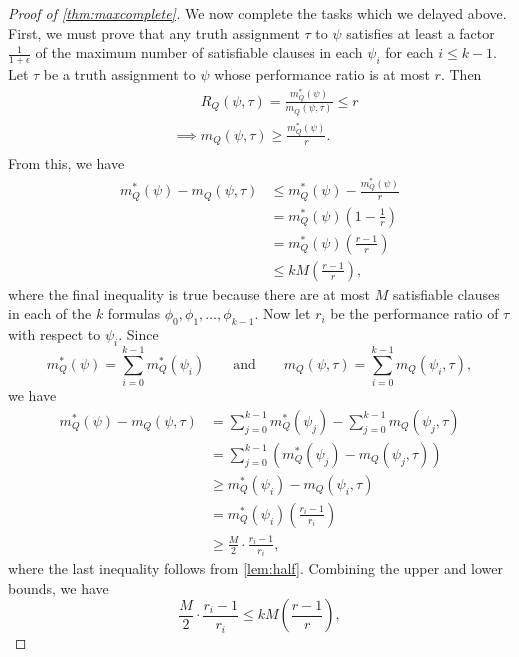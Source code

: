 \documentclass[]{article}
\theoremstyle{plain}
\theoremstyle{definition}
\begin{document}
\begin{proof}[Proof of \autoref{thm:maxcomplete}]
  We now complete the tasks which we delayed above.
  First, we must prove that any truth assignment $\tau$ to $\psi$ satisfies at least a factor $\frac{1}{1 + \epsilon}$ of the maximum number of satisfiable clauses in each $\psi_i$ for each $i \leq k - 1$.
  Let $\tau$ be a truth assignment to $\psi$ whose performance ratio is at most $r$.
  Then
  \begin{align*}
    & \phantom{\implies} R_Q(\psi, \tau) = \frac{m^*_Q(\psi)}{m_Q(\psi, \tau)} \leq r \\
    & \implies m_Q(\psi, \tau) \geq \frac{m^*_Q(\psi)}{r}. \\
  \end{align*}
  From this, we have
  \begin{align*}
    m^*_Q(\psi) - m_Q(\psi, \tau) & \leq m^*_Q(\psi) - \frac{m^*_Q(\psi)}{r} \\
    & = m^*_Q(\psi) \left(1 - \frac{1}{r}\right) \\
    & = m^*_Q(\psi) \left(\frac{r - 1}{r}\right)\\
    & \leq kM \left(\frac{r - 1}{r}\right),
  \end{align*}
  where the final inequality is true because there are at most $M$ satisfiable clauses in each of the $k$ formulas $\phi_0, \phi_1, \dotsc, \phi_{k - 1}$.
  Now let $r_i$ be the performance ratio of $\tau$ with respect to $\psi_i$.
  Since
  \begin{equation*}
    m_Q^*(\psi) = \sum_{i = 0}^{k - 1}{m_Q^*(\psi_i)} \qquad \text{and} \qquad m_Q(\psi, \tau) = \sum_{i = 0}^{k - 1}{m_Q(\psi_i, \tau)},
  \end{equation*}
  we have
  \begin{align*}
    m^*_Q(\psi) - m_Q(\psi, \tau) & = \sum_{j = 0}^{k - 1}{m_Q^*(\psi_j)} - \sum_{j = 0}^{k - 1}{m_Q(\psi_j, \tau)} \\
    & = \sum_{j = 0}^{k - 1}{\left(m_Q^*(\psi_j) - m_Q(\psi_j, \tau)\right)} \\
    & \geq m_Q^*(\psi_i) - m_Q(\psi_i, \tau) \\
    & = m_Q^*(\psi_i) \left(\frac{r_i - 1}{r_i}\right) \\
    & \geq \frac{M}{2} \cdot \frac{r_i - 1}{r_i},
  \end{align*}
  where the last inequality follows from \autoref{lem:half}.
  Combining the upper and lower bounds, we have
  \begin{equation*}
    \frac{M}{2} \cdot \frac{r_i - 1}{r_i} \leq kM \left(\frac{r - 1}{r}\right),
  \end{equation*}

\end{proof}
\end{document}
